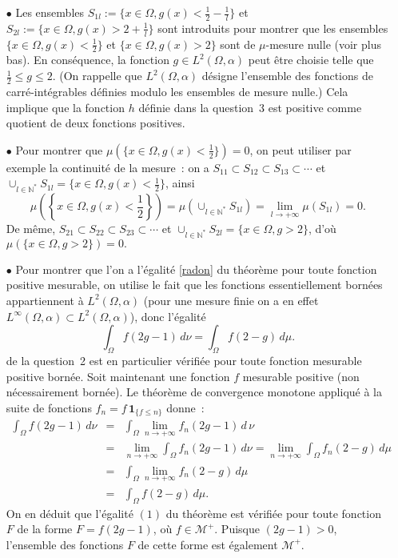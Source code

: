 {\begin{enumerate}
{\begin{itemize}
\item[$\bullet$] Les ensembles $S_{1l} := \{x\in\Omega, g(x) <
\frac{1}{2} - \frac{1}{l}\}$ et $S_{2l} := \{x\in \Omega, g(x)
> 2 + \frac{1}{l}\}$ sont introduits pour montrer que les
ensembles $\{x\in\Omega, g(x) < \frac{1}{2}\}$ et $\{x\in\Omega,
g(x) > 2\}$ sont de ${\mu}$-mesure nulle (voir plus bas). En
cons\'equence, la fonction $g\in L^2(\Omega, \alpha)$ peut \^etre
choisie telle que $\frac{1}{2} \leq g \leq 2$. (On rappelle que
$L^2(\Omega, \alpha)$ d\'esigne l'ensemble des fonctions de
carr\'e-int\'egrables d\'efinies modulo les ensembles de mesure
nulle.) Cela implique que la fonction $h$ d\'efinie dans la
question~3 est positive comme quotient de deux fonctions
positives.

\item[$\bullet$] Pour montrer que $\mu\left(\{x\in\Omega, g(x) <
\frac{1}{2}\}\right) = 0$, on peut utiliser par exemple la
continuit\'e de la mesure~: on a $S_{11} \subset S_{12} \subset
S_{13} \subset \cdots$ et $\cup_{l\in\mathbb{N}^*} S_{1l} =
\{x\in\Omega, g(x) < \frac{1}{2} \}$, ainsi
$$
\mu\left(\left\{x\in\Omega, g(x) < \frac{1}{2} \right\} \right) =
\mu\left(\cup_{l\in\mathbb{N}^*} S_{1l} \right) =
\lim_{l\rightarrow+\infty} \mu\left(S_{1l}\right) = 0.
$$
De m\^eme, $S_{21} \subset S_{22} \subset S_{23} \subset \cdots$
et $\cup_{l\in\mathbb{N}^*} S_{2l} = \{x\in\Omega, g > 2\}$,
d'o\`u $\mu\left(\{x\in\Omega, g > 2\}\right) = 0.$

\item[$\bullet$] Pour montrer que l'on a l'\'egalit\'e \eqref{radon} du
th\'eor\`eme pour toute fonction positive mesurable, on utilise le
fait que les fonctions essentiellement born\'ees appartiennent \`a
$L^2(\Omega, \alpha)$ (pour une mesure finie on a en effet
$L^{\infty}(\Omega, \alpha) \subset L^2(\Omega, \alpha)$), donc
l'\'egalit\'e
$$
\int_{\Omega} f(2g - 1) \,d\nu =  \int_{\Omega} f(2 - g) \,d\mu.
$$
de la question~2 est en particulier v\'erifi\'ee pour toute
fonction mesurable positive born\'ee. Soit maintenant une fonction
$f$ mesurable positive (non n\'ecessairement born\'ee). Le
th\'eor\`eme de convergence monotone appliqu\'e \`a la suite de
fonctions $f_n = f\,\mathbf{1}_{\{f \leq n\}}$ donne~:
$$
\begin{array}{lcl}
\int_{\Omega} f(2g - 1) \,d\nu & = & \int_{\Omega}
\lim_{n\rightarrow +\infty} f_{n}(2g - 1)\,d\,\nu \\ &=&
\lim_{n\rightarrow +\infty} \int_{\Omega} f_n(2g - 1) \,d\nu =
\lim_{n\rightarrow +\infty} \int_{\Omega} f_n(2 - g) \,d\mu\\ & =
&
\int_{\Omega}\lim_{n\rightarrow +\infty}f_n(2 - g) \,d\mu\\
& = & \int_{\Omega} f(2-g) \,d\mu.
\end{array}
$$
On en d\'eduit que l'\'egalit\'e $(1)$ du th\'eor\`eme est
v\'erifi\'ee pour toute fonction $F$ de la forme $F = f(2g-1)$,
o\`u $f\in\mathcal{M}^+$. Puisque $(2g-1)>0$, l'ensemble des
fonctions $F$ de cette forme est \'egalement $\mathcal{M}^+$.
\end{itemize}
}
\end{enumerate}
}
